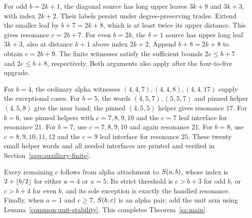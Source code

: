 For odd $b=2k+1$, the diagonal source has long upper leaves $3k+8$ and $3k+3$, with index $2k+2$. Their labels persist under degree-preserving trades. Extend the smaller leaf by $b+7=2k+8$, which is at least twice its upper distance. This gives resonance $c=2b+7$. For even $b=2k$, the $\delta=1$ source has upper long leaf $3k+3$, also at distance $k+1$ above index $2k+2$. Append $b+8=2k+8$ to obtain $c=2b+9$. The finite witnesses satisfy the sufficient bounds $2e\le b+7$ and $2e\le b+8$, respectively. Both arguments also apply after the four-to-five upgrade.

For $b=4$, the ordinary alpha witnesses $(4,4,7),(4,4,8),(4,4,17)$ supply the exceptional cases. For $b=5$, the words $(4,5,7),(5,5,7)$ and pinned helper $(4,5,8)$ give the near band; the pinned $(4,5,5)$ helper gives resonance $17$. For $b=6$, use pinned helpers with $c=7,8,9,10$ and the $c=7$ leaf interface for resonance $21$. For $b=7$, use $c=7,8,9,10$ and again resonance $21$. For $b=8$, use $c=8,9,10,11,12$ and the $c=9$ leaf interface for resonance $25$. These twenty small helper words and all needed interfaces are printed and verified in Section~\ref{app:auxiliary-finite}.

Every remaining $c$ follows from alpha attachment to $S\!\left(a,b\right)$, whose index is $2+\left\lfloor b/2\right\rfloor$ for either $a=4$ or $a=5$. Its strict threshold is $c>b+3$ for odd $b$, or $c>b+4$ for even $b$, and its sole exception is exactly the handled resonance. Finally, when $a=1$ and $c\ge7$, $S\!\left(b,c\right)$ is an alpha pair; add the unit arm using Lemma~\ref{common:unit-stability}. This completes Theorem~\ref{sa:main}.

